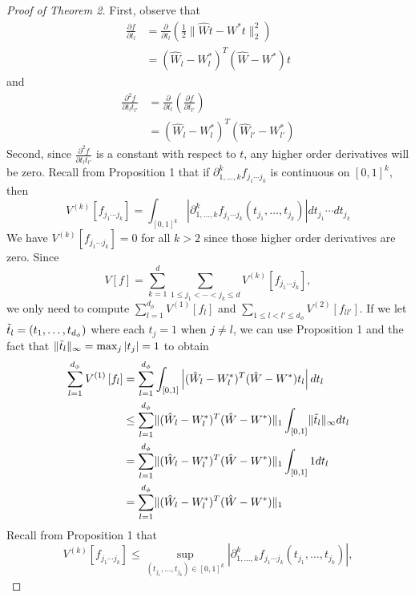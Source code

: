 \documentclass{article}
\begin{document}
\begin{proof}[Proof of Theorem 2]
    First, observe that
    \begin{align*}
        \frac{\partial f}{\partial t_l} & = \frac{\partial}{\partial t_l} \left( \frac{1}{2} \lVert \hat{W}t - W^* t \rVert_2^2 \right) \\
        & = (\hat{W}_l - W^{*}_{l})^T (\hat{W} - W^*) t
    \end{align*}
    and
    \begin{align*}
        \frac{\partial^2 f}{\partial t_l t_{l'}} & = \frac{\partial}{\partial t_{l}} \left(\frac{\partial f}{\partial t_{l'}} \right) \\
        & = (\hat{W}_l - W^{*}_l)^T (\hat{W}_{l'} - W^{*}_{l'})
    \end{align*}
    Second, since $\frac{\partial^2 f}{\partial t_l t_{l'}}$ is a constant with respect to $t$, any higher order derivatives will be zero. Recall from Proposition 1 that if $\partial^{k}_{1, \ldots, k} f_{j_1 \cdots j_k}$ is continuous on $[0, 1]^k$, then
    \[V^{(k)} \left[f_{j_1 \cdots j_k} \right] = \int_{[0, 1]^k} \left| \partial^{k}_{1, \ldots, k} f_{j_1 \cdots j_k}(t_{j_1}, \ldots, t_{j_k}) \right| dt_{j_1} \cdots dt_{j_k}\]
    We have $V^{(k)} \left[f_{j_1 \cdots j_k}\right] = 0$ for all $k > 2$ since those higher order derivatives are zero. Since
    \[V[f] = \sum_{k=1}^{d} \sum_{1 \leq j_1 < \cdots < j_k \leq d} V^{(k)} \left[f_{j_1 \cdots j_k} \right],\]
    we only need to compute $\sum_{l=1}^{d_\phi} V^{(1)} \left[f_l \right]$ and $\sum_{1 \leq l < l' \leq d_\phi} V^{(2)} \left[f_{l l'} \right]$. If we let $\Tilde{t}_l = (t_1, \ldots, t_{d_\phi})$ where each $t_j = 1$ when $j \neq l$, we can use Proposition 1 and the fact that $\lVert \Tilde{t}_l \rVert_{\infty} = \max_{j} |t_j| = 1$ to obtain
    \begin{align*}
        \sum_{l=1}^{d_\phi} V^{(1)} \left[f_l \right] & = \sum_{l=1}^{d_\phi} \int_{[0, 1]} \left| (\hat{W}_l - W^{*}_l)^T (\hat{W} - W^*) t_l \right| dt_l \\ 
        & \leq \sum_{l=1}^{d_\phi} \lVert (\hat{W}_l - W^{*}_l)^T (\hat{W} - W^*) \rVert_1 \int_{[0, 1]} \lVert \Tilde{t}_l \rVert_{\infty} dt_l \\
        & = \sum_{l=1}^{d_\phi} \lVert (\hat{W}_l - W^{*}_l)^T (\hat{W} - W^*) \rVert_1 \int_{[0, 1]} 1 dt_l \\
        & = \sum_{l=1}^{d_\phi} \lVert (\hat{W}_l - W^{*}_l)^T (\hat{W} - W^*) \rVert_1
    \end{align*}
    Recall from Proposition 1 that 
    \[V^{(k)} \left[f_{j_1 \cdots j_k} \right] \leq \sup_{(t_{j_1}, \ldots, t_{j_k}) \in [0, 1]^k} \left| \partial^{k}_{1, \ldots, k} f_{j_1 \cdots j_k}(t_{j_1}, \ldots, t_{j_k})\right|,\]

\end{proof}
\end{document}
